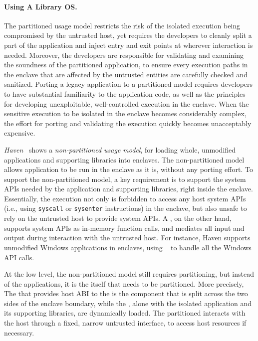 \paragraph{Using A Library OS.}
 
The partitioned usage model
restricts the risk of the isolated execution being
compromised by the untrusted host,
yet requires the developers to
cleanly split a part of the application
and inject entry and exit points at wherever interaction is needed.
Moreover, the developers are responsible
for validating and examining the soundness of the partitioned application,
to ensure every execution paths in the enclave
that are affected by the untrusted entities
are carefully checked and sanitized.
Porting a legacy application to a partitioned model
requires developers to have substantial familiarity to the application code,
as well as the principles for
developing unexploitable,
well-controlled execution in the enclave.
When the sensitive execution to be isolated in the enclave
becomes considerably complex,
the effort for porting and validating the execution
quickly becomes unacceptably expensive.

\emph{Haven}~\cite{baumann14haven}
shows a \emph{non-partitioned usage model},
for loading whole, unmodified applications and supporting libraries
into enclaves.
The non-partitioned model allows application to be run in the enclave as it is, without any porting effort.
To support the non-partitioned model,
a key requirement is to support the system APIs needed by
the application and supporting libraries,
right inside the enclave.
Essentially, the execution not only is forbidden to access any host system APIs
(i.e., using {\tt syscall} or {\tt sysenter} instructions)
in the enclave,
but also unsafe to rely on the untrusted host
to provide system APIs.
A \libos{}, on the other hand, supports system APIs as in-memory function calls,
and mediates all input and output
during interaction with the untrusted host.
For instance, Haven supports unmodified Windows applications in enclaves,
using \drawbridge{} \libos{}~\cite{porter11drawbridge}
to handle all the Windows API calls.

At the low level, the non-partitioned model still requires partitioning, but instead of the applications,
it is the \libos{} itself that needs to be partitioned.
More precisely, The \pal{} that provides host ABI to the \libos{} is the component that is split across the two sides of the enclave boundary,
while the \libos{}, alone with the isolated application
and its supporting libraries,
are dynamically loaded.
The partitioned \pal{} interacts with the host through a fixed, narrow untrusted interface,
to access host resources if necessary.
